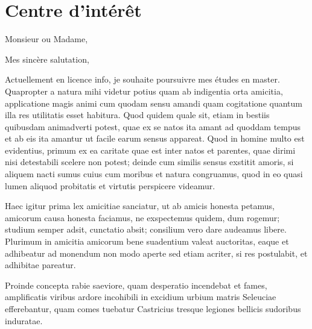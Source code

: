 \documentclass[11pt,a4paper,sans]{moderncv}        %
\begin{document}
\section{Centre d'intérêt}


\clearpage
\date{2 Janvier 2016}
\opening{Monsieur ou Madame,}
\closing{Mes sincère salutation,}
\makelettertitle

Actuellement en licence info, je souhaite poursuivre mes études en master.\\
Quapropter a natura mihi videtur potius quam ab indigentia orta amicitia, applicatione magis animi cum quodam sensu amandi quam cogitatione quantum illa res utilitatis esset habitura. Quod quidem quale sit, etiam in bestiis quibusdam animadverti potest, quae ex se natos ita amant ad quoddam tempus et ab eis ita amantur ut facile earum sensus appareat. Quod in homine multo est evidentius, primum ex ea caritate quae est inter natos et parentes, quae dirimi nisi detestabili scelere non potest; deinde cum similis sensus exstitit amoris, si aliquem nacti sumus cuius cum moribus et natura congruamus, quod in eo quasi lumen aliquod probitatis et virtutis perspicere videamur.

Haec igitur prima lex amicitiae sanciatur, ut ab amicis honesta petamus, amicorum causa honesta faciamus, ne exspectemus quidem, dum rogemur; studium semper adsit, cunctatio absit; consilium vero dare audeamus libere. Plurimum in amicitia amicorum bene suadentium valeat auctoritas, eaque et adhibeatur ad monendum non modo aperte sed etiam acriter, si res postulabit, et adhibitae pareatur.

Proinde concepta rabie saeviore, quam desperatio incendebat et fames, amplificatis viribus ardore incohibili in excidium urbium matris Seleuciae efferebantur, quam comes tuebatur Castricius tresque legiones bellicis sudoribus induratae.


\makeletterclosing

\end{document}
